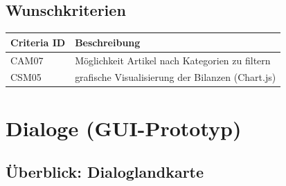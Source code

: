 \documentclass[a4paper]{article}
\begin{document}

\subsection{Wunschkriterien}

\begin{longtable}{|p{100px}|p{250px}|}
	\hline
	\rowcolor[HTML]{C0C0C0}
	Criteria ID & Beschreibung \\ \hline
	CAM07 & Möglichkeit Artikel nach Kategorien zu filtern  \\ \hline
	CSM05 & grafische Visualisierung der Bilanzen (Chart.js)  \\ \hline
\end{longtable}

\section{Dialoge (GUI-Prototyp)}

\subsection{Überblick: Dialoglandkarte}
\end{document}
